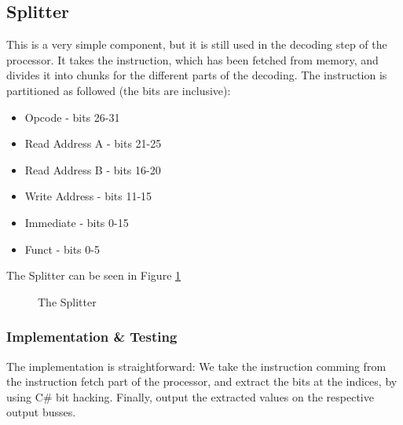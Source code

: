 \subsection{Splitter}
This is a very simple component, but it is still used in the decoding step of
the processor. It takes the instruction, which has been fetched from memory,
and divides it into chunks for the different parts of the decoding. The
instruction is partitioned as followed (the bits are inclusive):
\begin{itemize}
    \item Opcode - bits 26-31
    \item Read Address A - bits 21-25
    \item Read Address B - bits 16-20
    \item Write Address - bits 11-15
    \item Immediate - bits 0-15
    \item Funct - bits 0-5
\end{itemize}
The Splitter can be seen in Figure \ref{fig:split}
\begin{figure}
    \centering
    \caption{The Splitter}
    \label{fig:split}
\end{figure}

\subsubsection*{Implementation \& Testing}
The implementation is straightforward: We take the instruction comming from the
instruction fetch part of the processor, and extract the bits at the indices,
by using C\# bit hacking. Finally, output the extracted values on the
respective output busses.

